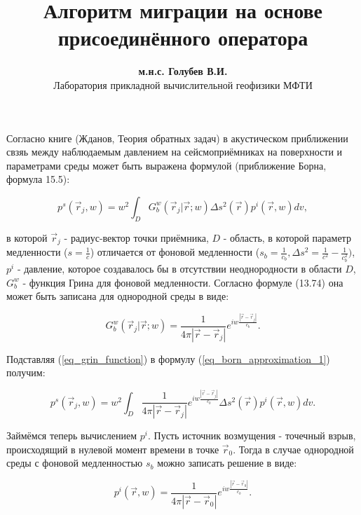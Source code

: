 \documentclass{article}
\begin{document}
\title{Алгоритм миграции на основе присоединённого оператора}
\author{\textbf{м.н.с. Голубев В.И.} \\ Лаборатория прикладной вычислительной геофизики МФТИ}
\maketitle

Согласно книге (Жданов, Теория обратных задач) в акустическом приближении свзяь между наблюдаемым давлением на
сейсмоприёмниках на поверхности и параметрами среды может быть выражена формулой (приближение Борна, формула 15.5):

\begin{equation}
\label{eq_born_approximation_1}
p^s(\vec{r}_j, w) = w^2\int_D G^w_b(\vec{r}_j|\vec{r};w)\Delta s^2(\vec{r})p^i(\vec{r},w)  dv,
\end{equation}

в которой $\vec{r}_j$ - радиус-вектор точки приёмника, $D$ - область, в которой параметр медленности ($s = \frac{1}{c}$)
отличается от фоновой медленности ($s_b = \frac{1}{c_b},\Delta s^2 = \frac{1}{c^2} - \frac{1}{c^2_b})$, $p^i$ - давление, которое создавалось бы
в отсутствии неоднородности в области $D$, $G^w_b$ - функция Грина для фоновой медленности.
Согласно формуле (13.74) она может быть записана для однородной среды в виде:

\begin{equation}
\label{eq_grin_function}
 G^w_b(\vec{r}_j|\vec{r};w) = \frac{1}{4\pi|\vec{r}-\vec{r}_j|}e^{iw\frac{|\vec{r}-\vec{r}_j|}{c_b}}.
\end{equation}

Подставляя (\ref{eq_grin_function}) в формулу (\ref{eq_born_approximation_1}) получим:

\begin{equation}
\label{eq_born_approximation_2}
p^s(\vec{r}_j, w) = w^2\int_D \frac{1}{4\pi|\vec{r}-\vec{r}_j|}e^{iw\frac{|\vec{r}-\vec{r}_j|}{c_b}} \Delta s^2(\vec{r})p^i(\vec{r},w)  dv.
\end{equation}

Займёмся теперь вычислением $p^i$.
Пусть источник возмущения - точечный взрыв, происходящий в нулевой момент времени в точке $\vec{r}_0$.
Тогда в случае однородной среды с фоновой медленностью $s_b$ можно записать решение в виде:

\begin{equation}
\label{eq_point_explosion}
p^i(\vec{r}, w) = \frac{1}{4\pi|\vec{r}-\vec{r}_0|}e^{iw\frac{|\vec{r}-\vec{r}_0|}{c_b}}.
\end{equation}
\end{document}
